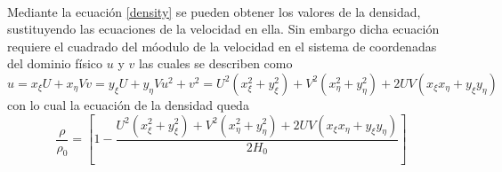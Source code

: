 \documentclass[letterpaper, openright, 12pt]{book}
\begin{document}
    \paragraph*{}
        Mediante la ecuación \ref{density} se pueden obtener los valores de la
        densidad, sustituyendo las ecuaciones de la velocidad en ella. Sin
        embargo dicha ecuación requiere el cuadrado del móodulo de la velocidad
        en el sistema de coordenadas del dominio físico $u$ y $v$ las cuales se
        describen como
        \begin{subequations}
            \begin{equation}
                u = x_\xi U + x_\eta V
            \end{equation}
            \begin{equation}
                v = y_\xi U + y_\eta V
            \end{equation}
            \begin{equation}
                u^2 + v^2 = U^2 \left( x_\xi^2 + y_\xi^2 \right)
                        + V^2 \left( x_\eta^2 + y_\eta^2 \right)
                        + 2UV \left( x_\xi x_\eta + y_\xi y_\eta \right)
            \end{equation}
        \end{subequations}
        con lo cual la ecuación de la densidad queda
        \begin{equation}
            \frac{\rho}{\rho_0} = \left[ 1 -
                \frac{U^2 \left( x_\xi^2 + y_\xi^2 \right)
                        + V^2 \left( x_\eta^2 + y_\eta^2 \right)
                        + 2UV \left( x_\xi x_\eta + y_\xi y_\eta \right)}
                    {2H_0}
            \right]
        \end{equation}
\end{document}
